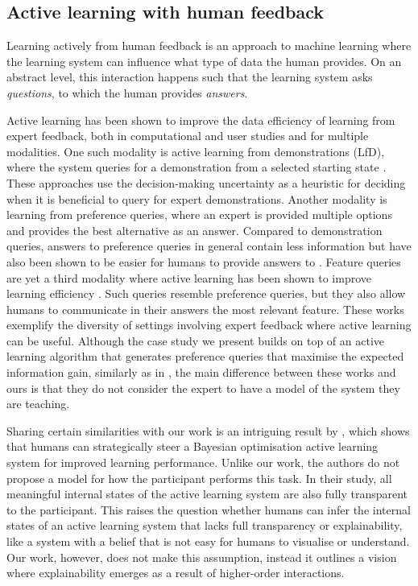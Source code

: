 \documentclass[letterpaper]{article} %
\begin{document}
\subsection{Active learning with human feedback}

Learning actively from human feedback is an approach to machine learning where the learning system can influence what type of data the human provides. On an abstract level, this interaction happens such that the learning system asks \textit{questions}, to which the human provides \textit{answers}. 

Active learning has been shown to improve the data efficiency of learning from expert feedback, both in computational and user studies and for multiple modalities. One such modality is active learning from demonstrations (LfD), where the system queries for a demonstration from a selected starting state \cite{Silver2012ActiveLfD, Chen2020ActiveDQN}. These approaches use the decision-making uncertainty as a heuristic for deciding when it is beneficial to query for expert demonstrations. Another modality is learning from preference queries, where an expert is provided multiple options and provides the best alternative as an answer. Compared to demonstration queries, answers to preference queries in general contain less information but have also been shown to be easier for humans to provide answers to \cite{biyik2022dempref, biyik2023ActivePreferenceGP}. Feature queries are yet a third modality where active learning has been shown to improve learning efficiency \cite{Basu2018learning}. Such queries resemble preference queries, but they also allow humans to communicate in their answers the most relevant feature. These works exemplify the diversity of settings involving expert feedback where active learning can be useful. Although the case study we present builds on top of an active learning algorithm that generates preference queries that maximise the expected information gain, similarly as in \cite{biyik2022dempref}, the main difference between these works and ours is that they do not consider the expert to have a model of the system they are teaching.

Sharing certain similarities with our work is an intriguing result by \cite{colella2020strategic}, which shows that humans can strategically steer a Bayesian optimisation active learning system for improved learning performance. Unlike our work, the authors do not propose a model for how the participant performs this task. In their study, all meaningful internal states of the active learning system are also fully transparent to the participant. This raises the question whether humans can infer the internal states of an active learning system that lacks full transparency or explainability, like a system with a belief that is not easy for humans to visualise or understand. Our work, however, does not make this assumption, instead it outlines a vision where explainability emerges as a result of higher-order interactions.
\end{document}

